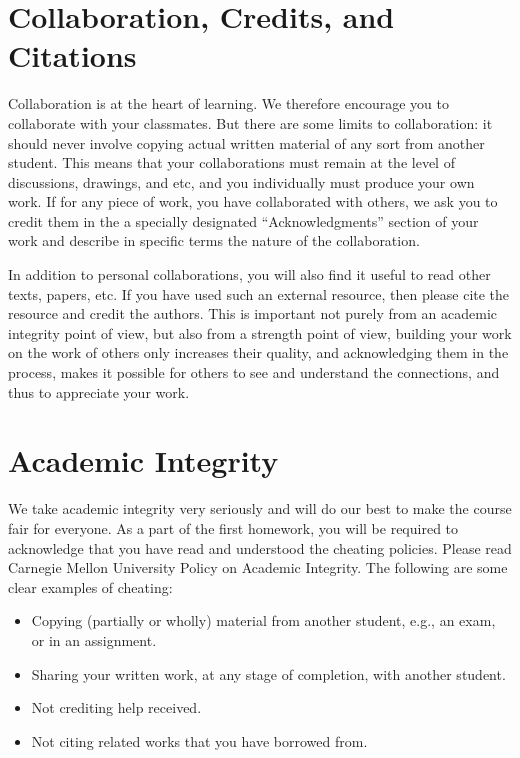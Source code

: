 \section{Collaboration, Credits, and Citations}


Collaboration is at the heart of learning.  We therefore encourage you to collaborate with your classmates.
%
But there are some limits to collaboration: it should never involve copying actual written material of any sort from another student.
%
This means that your collaborations must remain at the level of discussions, drawings, and etc, and you individually must produce your own work.
%
If for any piece of work, you have collaborated with others, we ask you to credit them in the a specially designated ``Acknowledgments'' section of your work and describe in specific terms the nature of the collaboration.


In addition to personal collaborations, you will also find it useful to read other texts, papers, etc.
%
If you have used such an external resource, then please cite the resource and credit  the authors.
%
This is important not purely from an academic integrity point of view, but also from a strength point of view, building your work on the work of others only increases their quality, and acknowledging them in the process, makes it possible for others to see and understand the connections, and thus to appreciate your work.



\section{Academic Integrity}
We take academic integrity very seriously and will do our best to make the course fair for everyone. As a part of the first homework, you will be required to acknowledge that you have read and understood the cheating policies. Please read Carnegie Mellon University Policy on Academic Integrity. The following are some clear examples of cheating:

\begin{itemize}

\item Copying (partially or wholly) material from another student, e.g., an exam, or in an assignment.

\item Sharing your written work, at any stage of completion, with another student.

\item Not crediting help received.

\item Not citing related works that you have borrowed from.
\end{itemize}

